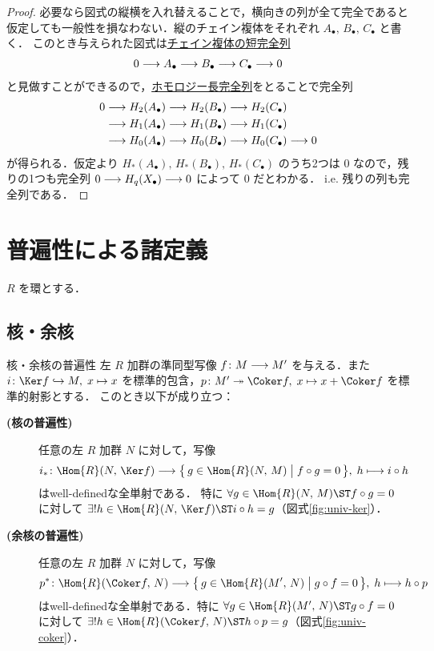 \documentclass[algtopo_main]{subfiles}
\begin{document}
\begin{proof}
	必要なら図式の縦横を入れ替えることで，横向きの列が全て完全であると仮定しても一般性を損なわない．縦のチェイン複体をそれぞれ $A_\bullet,\, B_\bullet,\, C_\bullet$ と書く．
	このとき与えられた図式は\hyperref[def:exact-chain]{チェイン複体の短完全列}
	\begin{align}
		0 \longrightarrow A_\bullet\longrightarrow B_\bullet \longrightarrow C_\bullet \longrightarrow 0
	\end{align}
	と見做すことができるので，\hyperref[thm:LES]{ホモロジー長完全列}をとることで完全列
	\begin{align}
		0 &\longrightarrow H_2(A_\bullet) \longrightarrow H_2(B_\bullet) \longrightarrow H_2(C_\bullet) \\
		&\longrightarrow H_1(A_\bullet) \longrightarrow H_1(B_\bullet) \longrightarrow H_1(C_\bullet) \\
		&\longrightarrow H_0(A_\bullet) \longrightarrow H_0(B_\bullet) \longrightarrow H_0(C_\bullet) \longrightarrow 0
	\end{align}
	が得られる．仮定より $H_*(A_\bullet),\, H_*(B_\bullet),\, H_*(C_\bullet)$ のうち2つは $0$ なので，残りの1つも完全列 $0 \longrightarrow H_q(X_\bullet) \longrightarrow 0$ によって $0$ だとわかる．
	i.e. 残りの列も完全列である．
\end{proof}


\section{普遍性による諸定義}

$R$ を環とする．

\subsection{核・余核}

\begin{myprop}[label=prop:univ-ker]{核・余核の普遍性}
	左 $R$ 加群の準同型写像 $f\colon M \longrightarrow M'$ を与える．また $i \colon \Ker f \hookrightarrow M,\; x \mapsto x$ を標準的包含，$p \colon M' \twoheadrightarrow \Coker f,\; x \mapsto x + \Coker f$ を標準的射影とする．
	このとき以下が成り立つ：
	\begin{description}
		\item[\textbf{(核の普遍性)}] 任意の左 $R$ 加群 $N$ に対して，写像
		\begin{align}
			i_* \colon \Hom{R}(N,\, \Ker f) \lto \bigl\{\, g \in \Hom{R}(N,\, M) \bigm| f \circ g = 0 \,\bigr\},\; h \lmto i \circ h
		\end{align}
		はwell-definedな全単射である．
		特に $\forall g \in \Hom{R}(N,\, M) \ST f\circ g = 0$ に対して $\exists ! h \in \Hom{R}(N,\, \Ker f) \ST i \circ h = g$（図式\ref{fig:univ-ker}）．
		\item[\textbf{(余核の普遍性)}] 任意の左 $R$ 加群 $N$ に対して，写像
		\begin{align}
			p^* \colon \Hom{R}(\Coker f,\, N) \lto \bigl\{\, g \in \Hom{R}(M',\, N) \bigm| g \circ f = 0 \,\bigr\},\; h \lmto h \circ p
		\end{align}
		はwell-definedな全単射である．特に $\forall g \in \Hom{R}(M',\, N) \ST g\circ f = 0$ に対して $\exists ! h \in \Hom{R}(\Coker f,\, N) \ST h \circ p = g$（図式\ref{fig:univ-coker}）．
	\end{description}
\end{myprop}
\end{document}
